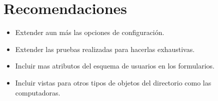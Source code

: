 \section{Recomendaciones}

\begin{itemize}
  \item Extender aun más las opciones de configuración.
  \item Extender las pruebas realizadas para hacerlas exhaustivas.
  \item Incluir mas atributos del esquema de usuarios en los formularios.
  \item Incluir vistas para otros tipos de objetos del directorio como las computadoras.
\end{itemize}
